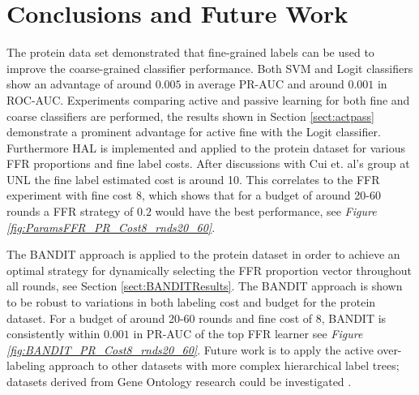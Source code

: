 \documentclass[ms]{nuthesis}
\begin{document}
\chapter{Conclusions and Future Work}
\par The protein data set demonstrated that fine-grained labels can be used
to improve the coarse-grained classifier performance. Both SVM and Logit
classifiers show an advantage of around $0.005$ in average PR-AUC and around
$0.001$ in ROC-AUC. Experiments comparing active and passive learning for both
fine and coarse classifiers are performed, the results shown in Section \ref{sect:actpass}
demonstrate a prominent advantage for active fine with the Logit classifier. Furthermore
 HAL is implemented and applied to the protein dataset for various FFR proportions and
 fine label costs. After discussions with Cui et. al's group at UNL \cite{bioPoster} the fine label
 estimated cost is around 10. This correlates to the FFR experiment with fine cost 8, which shows
 that for a budget of around 20-60 rounds a FFR strategy of $0.2$ would have the best performance,
 see \textit{Figure \ref{fig:ParamsFFR_PR_Cost8_rnds20_60}}.
 \par The BANDIT approach is applied to the protein dataset in order to achieve
 an optimal strategy for dynamically selecting the FFR proportion vector throughout all rounds, see
 Section \ref{sect:BANDITResults}. The BANDIT approach is shown to be robust to variations in both
 labeling cost and budget for the protein dataset. For a budget of around 20-60 rounds and fine cost of
 8, BANDIT is consistently within $0.001$ in PR-AUC of the top FFR learner see
 \textit{Figure \ref{fig:BANDIT_PR_Cost8_rnds20_60}}. Future work is to apply the
 active over-labeling approach to other datasets with more complex hierarchical label trees; datasets derived from
 Gene Ontology research could be investigated \cite{GeneOntology}.



\backmatter

%

%


\nocite{*}


\end{document}
